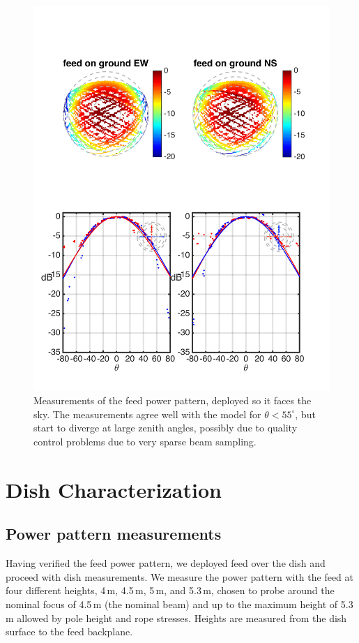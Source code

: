 \documentclass[preprint]{aastex}
\begin{document}
\begin{figure}[h]
\includegraphics[width=6.5in]{feed0_abs_old_ref_model.png}
\caption{Measurements of the feed power pattern, deployed so it faces the sky. The measurements agree well with the model for $\theta<55^\circ$, but start to diverge at large zenith angles, possibly due to quality control problems due to very sparse beam sampling.}
\label{fig:feed0}
\end{figure}

\section{Dish Characterization}

\subsection{Power pattern measurements}

Having verified the feed power pattern, we deployed feed over the dish and proceed with dish measurements. We measure the power pattern with the feed at four different heights, 4\,m, 4.5\,m, 5\,m, and 5.3\,m, chosen to probe around the nominal focus of 4.5\,m (the nominal beam) and up to the maximum height of 5.3\,m allowed by pole height and rope stresses. Heights are measured from the dish surface to the feed backplane. 
\end{document}
